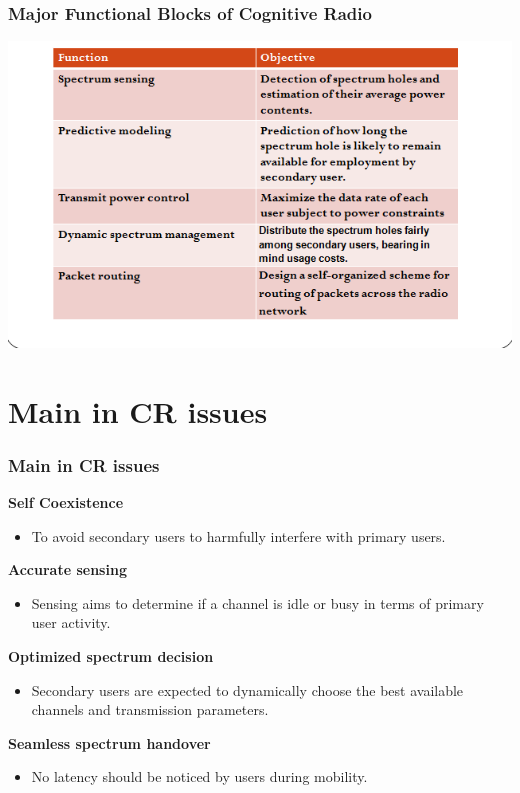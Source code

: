 \documentclass{beamer}
\begin{document}
\begin{frame}
\frametitle{Major Functional Blocks of Cognitive Radio}
\includegraphics[scale=0.75]{fns}
\end{frame}

\section{Main in CR issues}
\begin{frame}
\frametitle{Main in CR issues}
\textbf{Self Coexistence}\\
\begin{itemize}
\item To avoid secondary users to harmfully interfere with primary users.\\ 
\end{itemize}
\textbf{Accurate sensing}\\
\begin{itemize}
\item Sensing aims to determine if a channel is idle or busy in terms of primary user activity.\\
 \end{itemize}
\textbf{Optimized spectrum decision}\\
\begin{itemize}
\item Secondary users are expected to dynamically choose the best available channels and transmission parameters.\\
\end{itemize} 
\textbf{Seamless spectrum handover}\\
\begin{itemize}
\item No latency should be noticed by users during mobility.
\end{itemize} 
\end{frame}
\end{document}
